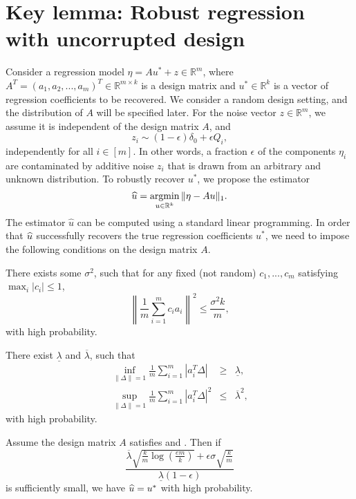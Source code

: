 
\section{Key lemma: Robust regression with uncorrupted design}
\label{sec:regression}

Consider a regression model $\eta=Au^*+z\in\mathbb{R}^m$, where $A^T=(a_1,a_2,...,a_m)^T\in\mathbb{R}^{m\times k}$ is a design matrix and $u^*\in\mathbb{R}^k$ is a vector of regression coefficients to be recovered. We consider a random design setting, and the distribution of $A$ will be specified later. For the noise vector $z\in\mathbb{R}^m$, we assume it is independent of the design matrix $A$, and
\begin{equation}
z_i\sim (1-\epsilon)\delta_0 + \epsilon Q_i, \label{eq:noise-add-con}
\end{equation}
independently for all $i\in[m]$. In other words, a fraction $\epsilon$ of the components $\eta_i$ are contaminated by
additive noise $z_i$ that is drawn from an arbitrary and unknown distribution. To robustly recover $u^*$, we propose the estimator
$$\widehat{u}=\mathop{\rm argmin}_{u\in\mathbb{R}^k}\|\eta-Au\|_1.$$
The estimator $\hat u$ can be computed using a standard linear programming.
In order that $\widehat{u}$ successfully recovers the true regression coefficients $u^*$, we need to impose the following conditions on the design matrix $A$.


\begin{con0}
There exists some $\sigma^2$, such that for any fixed (not random) $c_1,...,c_m$ satisfying $\max_i|c_i|\leq 1$,
\begin{equation}
  \left\|\frac{1}{m}\sum_{i=1}^mc_ia_i\right\|^2\leq \frac{\sigma^2k}{m},
\end{equation}
with high probability.
\end{con0}

\begin{con2}
There exist $\underline{\lambda}$ and $\overline{\lambda}$, such that
\begin{eqnarray}
\label{eq:l1-upper-A} \inf_{\|\Delta\|=1}\frac{1}{m}\sum_{i=1}^m|a_i^T\Delta| &\geq& \underline{\lambda}, \\
\label{eq:l2-upper-A} \sup_{\|\Delta\|=1}\frac{1}{m}\sum_{i=1}^m|a_i^T\Delta|^2 &\leq& \overline{\lambda}^2,
\end{eqnarray}
with high probability.
\end{con2}


\begin{thm}\label{thm:main-improved}
Assume the design matrix $A$ satisfies \conditionA{} and \conditionB. Then if
\begin{equation}
\frac{\overline{\lambda}\sqrt{\frac{k}{m}\log\left(\frac{em}{k}\right)}+\epsilon\sigma\sqrt{\frac{k}{m}}}{\underline{\lambda}(1-\epsilon)}
\end{equation}
is sufficiently small, we have $\widehat{u}=u^*$ with high probability.
\end{thm}

